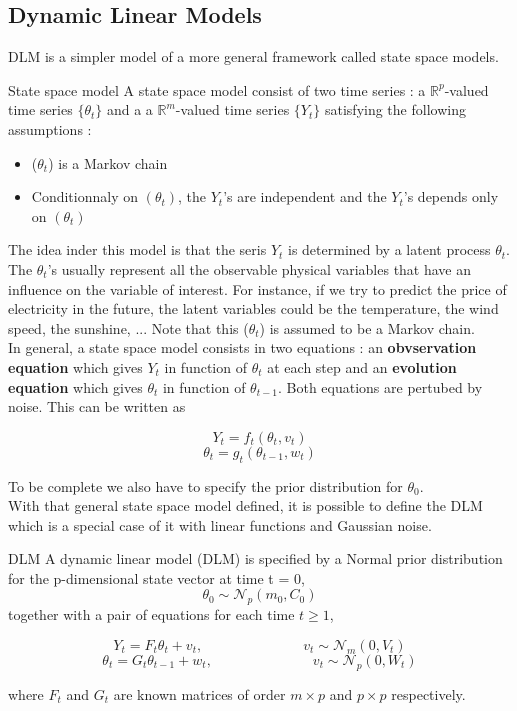 \documentclass{article}
\begin{document}
\subsection*{Dynamic Linear Models}
DLM is a simpler model of a more general framework called state space models. \\
\begin{definition}{State space model}
A state space model consist of two time series : a $\mathbb{R}^p$-valued time series $\{\theta_t\}$ and a a $\mathbb{R}^m$-valued time series $\{Y_t\}$ satisfying the following assumptions :

\begin{itemize}
        \item ($\theta_t$) is a Markov chain
        \item Conditionnaly on $(\theta_t)$, the $Y_t$'s are independent and the $Y_t$'s depends only on $(\theta_t)$
\end{itemize}

The idea inder this model is that the seris $Y_t$ is determined by a latent process $\theta_t$. The $\theta_t$'s usually represent all the observable physical variables that have an influence on the variable of interest. For instance, if we try to predict the price of electricity in the future, the latent variables could be the temperature, the wind speed, the sunshine, ... Note that this ($\theta_t$) is assumed to be a Markov chain. \\

In general, a state space model consists in two equations : an \textbf{obvservation equation} which gives $Y_t$ in function of $\theta_t$ at each step and an \textbf{evolution equation} which gives $\theta_t$ in function of $\theta_{t-1}$. Both equations are pertubed by noise. This can be written as

$$Y_t = f_t(\theta_t, v_t)$$
$$\theta_t = g_t(\theta_{t-1}, w_t)$$

To be complete we also have to specify the prior distribution for $\theta_0$. \\

With that general state space model defined, it is possible to define the DLM which is a special case of it with linear functions and Gaussian noise. \\

\begin{definition}{DLM}
A dynamic linear model (DLM) is specified by a Normal prior distribution for the p-dimensional state vector at time t = 0,
$$\theta_0 \sim \mathcal{N}_p(m_0, C_0)$$
together with a pair of equations for each time $t \ge 1$,

$$Y_t = F_t\theta_t + v_t, \hspace{3cm} v_t \sim \mathcal{N}_m(0, V_t)$$
$$\theta_t = G_t\theta_{t-1} + w_t, \hspace{3cm} v_t \sim \mathcal{N}_p(0, W_t)$$

where $F_t$ and $G_t$ are known matrices of order $m \times p$ and $p \times p$ respectively.
\end{definition}



\end{definition}


\end{document}
